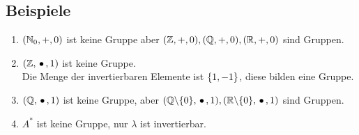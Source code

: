 
\subsection{Beispiele}

\begin{enumerate}
	
	\item
	$(\mathbb{N}_0, +, 0)$ ist keine Gruppe aber $(\mathbb{Z}, +, 0), (\mathbb{Q}, +, 0), (\mathbb{R}, +, 0)$ sind Gruppen.
	
	\item
	$(\mathbb{Z}, \,{\bullet}\,, 1)$ ist keine Gruppe.
	\\ Die Menge der invertierbaren Elemente ist $\left\{1, -1\right\}$, diese bilden eine Gruppe.
	
	\item
	$(\mathbb{Q}, \,{\bullet}\,, 1)$ ist keine Gruppe, aber $(\mathbb{Q} \backslash \{0\}, \,{\bullet}\,, 1), (\mathbb{R} \backslash \{0\}, \,{\bullet}\,, 1)$ sind Gruppen.
	
	\item
	$A^*$ ist keine Gruppe, nur $\lambda$ ist invertierbar.
	
\end{enumerate}

